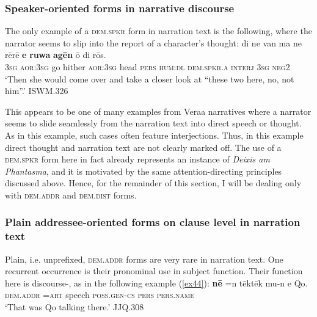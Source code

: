 \documentclass[output=paper
,modfonts
,nonflat]{langsci/langscibook}
\begin{document}
\subsubsection{Speaker-oriented forms in narrative discourse}
The only example of a \textsc{dem.spkr} form in narration text is the following, where the narrator seems to slip into the report of a character's thought:
\ea	\label{ex43}
\gll		di		ne			van	ma		ne			r\=er\=e				\textbf{e}		\textbf{ruwa}		\textbf{ag\=en}		\=o			di		r\=os.		\\
		\textsc{3sg}	\textsc{aor:3sg}		go		hither		\textsc{aor:3sg}		head		\textsc{pers}	\textsc{hum:dl}		\textsc{dem.spkr.a}	\textsc{interj}	\textsc{3sg}	\textsc{neg2}		\\
\glt	`Then she would come over and take a closer look at ``these two here, no, not him''.'		\hfill{ISWM.326}
\z

\noindent
This appears to be one of many examples from Vera{\textquotesingle}a narratives where a narrator seems to slide seamlessly from the narration text into direct speech or thought. As in this example, such cases often feature interjections. Thus, in this example direct thought and narration text are not clearly marked off. The use of a \textsc{dem.spkr} form here in fact already represents an instance of \textit{Deixis am Phantasma}, and it is motivated by the same attention-directing principles discussed above. Hence, for the remainder of this section, I will be dealing only with \textsc{dem.addr} and \textsc{dem.dist} forms. 

\subsubsection{Plain addressee-oriented forms on clause level in narration text}
Plain, i.e. unprefixed, \textsc{dem.addr} forms are very rare in narration text. One recurrent occurrence is their pronominal use in subject function. Their function here is discourse-, as in the following example (\ref{ex44}):
\ea	\label{ex44}
\gll		\textbf{n\=e}		=n 		t\=ekt\=ek 	mu-n 			e 			Qo{\textquotesingle}.	\\
\textsc{dem.addr}	\textsc{=art}		speech	\textsc{poss.gen-cs}	\textsc{pers}	\textsc{pers.name}	\\
\glt	`That was Qo{\textquotesingle} talking there.'			\hfill{JJQ.308}
\z
\end{document}
